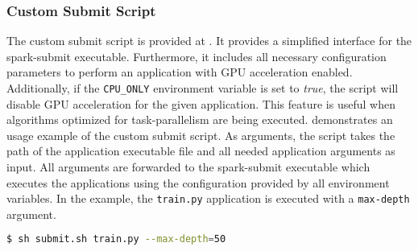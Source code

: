 \subsubsection{Custom Submit Script}
The custom submit script is provided at . It provides a simplified interface for the spark-submit executable. Furthermore, it includes all necessary configuration parameters to perform an application with GPU acceleration enabled. Additionally, if the \texttt{CPU\_ONLY} environment variable is set to \textit{true}, the script will disable GPU acceleration for the given application.
This feature is useful when algorithms optimized for task-parallelism are being executed.
 demonstrates an usage example of the custom submit script.
As arguments, the script takes the path of the application executable file and all needed application arguments as input. All arguments are forwarded to the spark-submit executable which executes the applications using the configuration provided by all environment variables. In the example, the \texttt{train.py} application is executed with a \texttt{max-depth} argument. 
\begin{lstlisting}[label=lst:06_env_depl_submit, caption=Usage of the submit script, language=bash, numbers=none]
$ sh submit.sh train.py --max-depth=50
\end{lstlisting}


